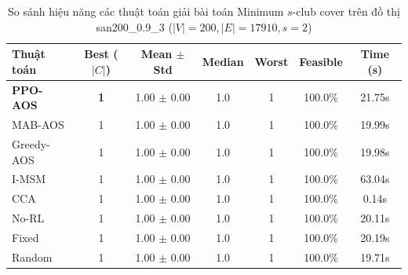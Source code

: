 \begin{table}[htbp]
\centering
\caption{So sánh hiệu năng các thuật toán giải bài toán Minimum $s$-club cover trên đồ thị san200_0.9_3 ($|V|=200, |E|=17910, s=2$)}
\label{tab:results_san200_0_9_3}
\begin{tabular}{lcccccc}
\hline
\textbf{Thuật toán} & \textbf{Best ($|C|$)} & \textbf{Mean $\pm$ Std} & \textbf{Median} & \textbf{Worst} & \textbf{Feasible} & \textbf{Time (s)} \\
\hline
\textbf{PPO-AOS} & \textbf{1} & 1.00 $\pm$ 0.00 & 1.0 & 1 & 100.0\% & 21.75s \\
MAB-AOS & 1 & 1.00 $\pm$ 0.00 & 1.0 & 1 & 100.0\% & 19.99s \\
Greedy-AOS & 1 & 1.00 $\pm$ 0.00 & 1.0 & 1 & 100.0\% & 19.98s \\
I-MSM & 1 & 1.00 $\pm$ 0.00 & 1.0 & 1 & 100.0\% & 63.04s \\
CCA & 1 & 1.00 $\pm$ 0.00 & 1.0 & 1 & 100.0\% & 0.14s \\
No-RL & 1 & 1.00 $\pm$ 0.00 & 1.0 & 1 & 100.0\% & 20.11s \\
Fixed & 1 & 1.00 $\pm$ 0.00 & 1.0 & 1 & 100.0\% & 20.19s \\
Random & 1 & 1.00 $\pm$ 0.00 & 1.0 & 1 & 100.0\% & 19.71s \\
\hline
\end{tabular}
\end{table}
